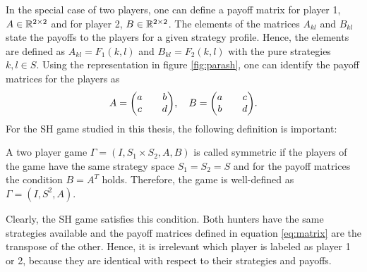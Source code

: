 In the special case of two players, one can define a payoff matrix for
player 1, $A \in \mathbb{R}^{2 \times2}$ and for player 2,
$B \in \mathbb{R}^{2 \times2}$. The elements of the matrices $A_{kl}$ and
$B_{kl}$ state the payoffs to the players for a given strategy profile. 
Hence, the elements are defined as $A_{kl}= F_1(k,l)$ and 
$B_{kl} =F_2(k,l)$ with the pure strategies $k,l \in S$.
Using the 
representation in figure \ref{fig:parash}, one can identify the 
payoff matrices for the players as
\begin{align}
     A = \mqty(a && b \\ c && d), \quad B = \mqty(a && c \\ b && d).
        \label{eq:matrix}
\end{align}
For the SH game studied in this thesis, the following definition is important: 
\begin{mydef}
        A two player game $\Gamma=(I,S_1 \times S_2, A,B)$ is called symmetric
        if the players of the game have the same strategy space $S_1=S_2=S$ and
        for the payoff matrices the condition $B=A^T$ holds. Therefore, the
        game is well-defined as $\Gamma=(I,S^2,A)$.
        \label{symmetry}
\end{mydef}
Clearly, the SH game satisfies this condition. Both hunters have the same 
strategies available and the payoff matrices defined in equation
\eqref{eq:matrix} are the transpose of the other.
Hence, it is irrelevant which player is labeled as player 1 or 2, because 
they are identical with respect to their strategies and payoffs.

